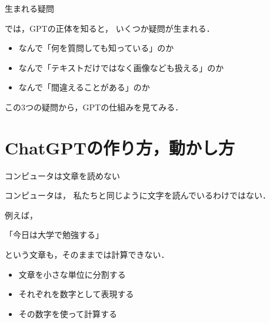\documentclass[aspectratio=169,professionalfonts]{beamer}
\begin{document}
\begin{frame}{生まれる疑問}

  では，GPTの正体を知ると，
  いくつか疑問が生まれる．

  \vspace{1em}

  \begin{itemize}
    \item なんで「何を質問しても知っている」のか

    \item なんで「テキストだけではなく画像なども扱える」のか

    \item なんで「間違えることがある」のか
  \end{itemize}

  \vspace{1em}

  この3つの疑問から，GPTの仕組みを見てみる．


\end{frame}

\section{ChatGPTの作り方，動かし方}

\begin{frame}{コンピュータは文章を読めない}

  コンピュータは，
  私たちと同じように文字を読んでいるわけではない．

  \vspace{1em}

  例えば，

  \begin{center}
    「今日は大学で勉強する」
  \end{center}

  という文章も，そのままでは計算できない．

  \vspace{1em}

  \begin{itemize}
    \item 文章を小さな単位に分割する
    \item それぞれを数字として表現する
    \item その数字を使って計算する
  \end{itemize}


\end{frame}
\end{document}
